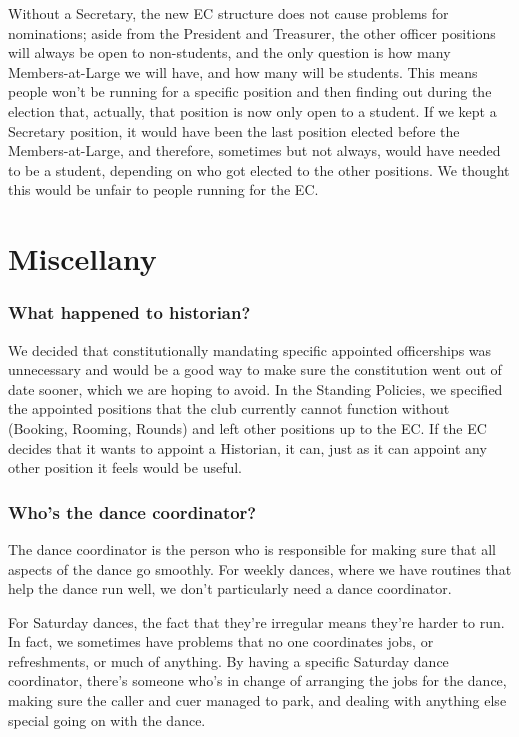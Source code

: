 \documentclass{article}
\begin{document}
Without a Secretary, the new EC structure does not cause problems for nominations; aside from the President and Treasurer, the other officer positions will always be open to non-students, and the only question is how many Members-at-Large we will have, and how many will be students. This means people won't be running for a specific position and then finding out during the election that, actually, that position is now only open to a student. If we kept a Secretary position, it would have been the last position elected before the Members-at-Large, and therefore, sometimes but not always, would have needed to be a student, depending on who got elected to the other positions. We thought this would be unfair to people running for the EC.


\section{Miscellany}

\subsubsection*{What happened to historian?}
We decided that constitutionally mandating specific appointed officerships was unnecessary and would be a good way to make sure the constitution went out of date sooner, which we are hoping to avoid. In the Standing Policies, we specified the appointed positions that the club currently cannot function without (Booking, Rooming, Rounds) and left other positions up to the EC. If the EC decides that it wants to appoint a Historian, it can, just as it can appoint any other position it feels would be useful.

\subsubsection*{Who's the dance coordinator?}
The dance coordinator is the person who is responsible for making sure that all aspects of the dance go smoothly. For weekly dances, where we have routines that help the dance run well, we don't particularly need a dance coordinator.

For Saturday dances, the fact that they're irregular means they're harder to run. In fact, we sometimes have problems that no one coordinates jobs, or refreshments, or much of anything. By having a specific Saturday dance coordinator, there's someone who's in change of arranging the jobs for the dance, making sure the caller and cuer managed to park, and dealing with anything else special going on with the dance.
\end{document}
